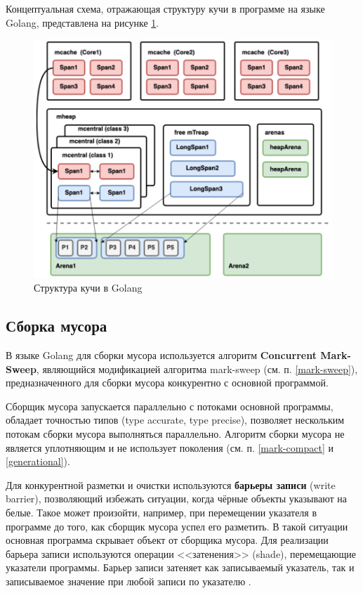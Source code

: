 Концептуальная схема, отражающая структуру кучи в программе на языке Golang, представлена на рисунке \ref{fig:golang_heap}.

\begin{figure}[H]
	\centering
	\includegraphics[width=\textwidth]{assets/golang-heap.png}
	\caption{Структура кучи в Golang}
	\label{fig:golang_heap}
\end{figure}



\subsection{Сборка мусора}

В языке Golang для сборки мусора используется алгоритм \textbf{Concurrent Mark-Sweep}, являющийся модификацией алгоритма mark-sweep (см. п. \ref{mark-sweep}), предназначенного для сборки мусора конкурентно с основной программой. \cite{golang_gc}

Сборщик мусора запускается параллельно с потоками основной программы, обладает точностью типов (type accurate, type precise), позволяет нескольким потокам сборки мусора выполняться параллельно. Алгоритм сборки мусора не является уплотняющим и не использует поколения (см. п. \ref{mark-compact} и \ref{generational}). \cite{golang_gc}

Для конкурентной разметки и очистки используются \textbf{барьеры записи} (write barrier), позволяющий избежать ситуации, когда чёрные объекты указывают на белые. Такое может произойти, например, при перемещении указателя в программе до того, как сборщик мусора успел его разметить. В такой ситуации основная программа скрывает объект от сборщика мусора. \cite{golang_gc} Для реализации барьера записи используются операции <<затенения>> (shade), перемещающие указатели программы. Барьер записи затеняет как записываемый указатель, так и записываемое значение при любой записи по указателю \cite{golang_barrier}. 

